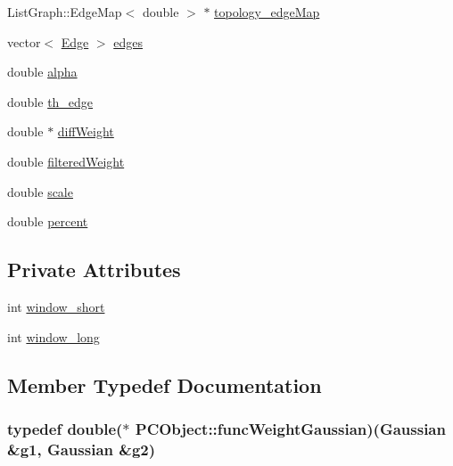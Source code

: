 \begin{DoxyCompactItemize}
\item 
\-List\-Graph\-::\-Edge\-Map$<$ double $>$ $\ast$ \hyperlink{class_p_c_object_a5f09a7006b5499186fe9908143dfbee9}{topology\-\_\-edge\-Map}
\item 
vector$<$ \hyperlink{struct_p_c_object_1_1_edge}{\-Edge} $>$ \hyperlink{class_p_c_object_a0d6dab1fe4edd99095e1fe236d4910a5}{edges}
\item 
double \hyperlink{class_p_c_object_ac94a79d35dece547fab98be2b70e9604}{alpha}
\item 
double \hyperlink{class_p_c_object_a2e2e26d46ec23849c062e9d28d349778}{th\-\_\-edge}
\item 
double $\ast$ \hyperlink{class_p_c_object_ae08580ed200d25aa8304fde6f924c9f3}{diff\-Weight}
\item 
double \hyperlink{class_p_c_object_a959539770a6c61a3db3ef480140d1ed0}{filtered\-Weight}
\item 
double \hyperlink{class_p_c_object_a8737196626b96a2730810a9cee2330ed}{scale}
\item 
double \hyperlink{class_p_c_object_a4ac23bed170d9a2993524e4b742c99a4}{percent}
\end{DoxyCompactItemize}
\subsection*{\-Private \-Attributes}
\begin{DoxyCompactItemize}
\item 
int \hyperlink{class_p_c_object_a6c90b358d6d19ab437841f829e448b7c}{window\-\_\-short}
\item 
int \hyperlink{class_p_c_object_a1606ff67b8422eac1ee46849bffdb69a}{window\-\_\-long}
\end{DoxyCompactItemize}


\subsection{\-Member \-Typedef \-Documentation}
\hypertarget{class_p_c_object_a57717df0ff6fbc92e693c08485479da3}{
\subsubsection[{func\-Weight\-Gaussian}]{\setlength{\rightskip}{0pt plus 5cm}typedef double($\ast$ {\bf \-P\-C\-Object\-::func\-Weight\-Gaussian})({\bf \-Gaussian} \&g1, {\bf \-Gaussian} \&g2)}}\label{class_p_c_object_a57717df0ff6fbc92e693c08485479da3}


